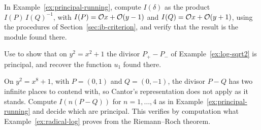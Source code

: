 \begin{exercise}
In Example~\ref{ex:principal-running}, compute $I(\delta)$ as the product
$I(P)\, I(Q)^{-1}$, with $I(P) = \mathcal{O} x + \mathcal{O} (y - 1)$ and $I(Q) = \mathcal{O} x + \mathcal{O}
(y + 1)$, using the procedures of Section~\ref{sec:ib-criterion}, and verify
that the result is the module found there.
\end{exercise}

\begin{exercise}
Use  to show that on $y^2 = x^2 + 1$ the divisor
$P_+ - P_-$ of Example~\ref{ex:log-sqrt2} is principal, and recover the
function $u_1$ found there.
\end{exercise}

\begin{exercise}
On $y^2 = x^8 + 1$, with $P = (0, 1)$ and $Q = (0, -1)$, the divisor $P - Q$
has two infinite places to contend with, so Cantor's representation does not
apply as it stands. Compute $I(n(P - Q))$ for $n = 1, \dots, 4$ as in
Example~\ref{ex:principal-running} and decide which are principal. This
verifies by computation what Example~\ref{ex:radical-log} proves from the
Riemann--Roch theorem.
\end{exercise}
